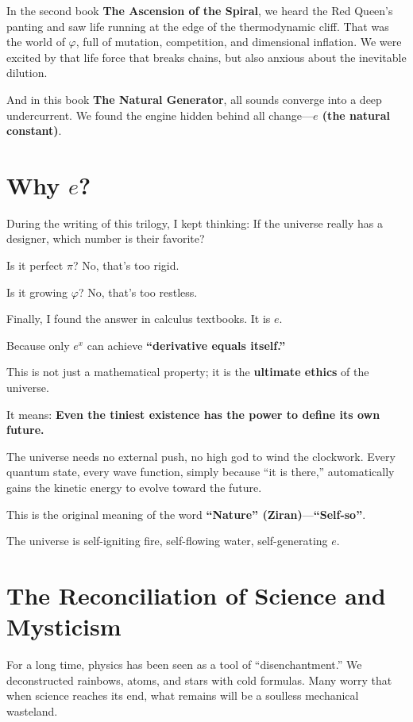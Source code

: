 \documentclass[11pt,a4paper,twoside]{book}
\begin{document}
In the second book \textbf{The Ascension of the Spiral}, we heard the Red Queen's panting and saw life running at the edge of the thermodynamic cliff. That was the world of \textbf{$\varphi$}, full of mutation, competition, and dimensional inflation. We were excited by that life force that breaks chains, but also anxious about the inevitable dilution.

And in this book \textbf{The Natural Generator}, all sounds converge into a deep undercurrent. We found the engine hidden behind all change---\textbf{$e$ (the natural constant)}.

\section{Why $e$?}

During the writing of this trilogy, I kept thinking: If the universe really has a designer, which number is their favorite?

Is it perfect $\pi$? No, that's too rigid.

Is it growing $\varphi$? No, that's too restless.

Finally, I found the answer in calculus textbooks. It is \textbf{$e$}.

Because only $e^x$ can achieve \textbf{``derivative equals itself.''}

This is not just a mathematical property; it is the \textbf{ultimate ethics} of the universe.

It means: \textbf{Even the tiniest existence has the power to define its own future.}

The universe needs no external push, no high god to wind the clockwork. Every quantum state, every wave function, simply because ``it is there,'' automatically gains the kinetic energy to evolve toward the future.

This is the original meaning of the word \textbf{``Nature'' (Ziran)}---\textbf{``Self-so''}.

The universe is self-igniting fire, self-flowing water, self-generating $e$.

\section{The Reconciliation of Science and Mysticism}

For a long time, physics has been seen as a tool of ``disenchantment.'' We deconstructed rainbows, atoms, and stars with cold formulas. Many worry that when science reaches its end, what remains will be a soulless mechanical wasteland.
\end{document}
